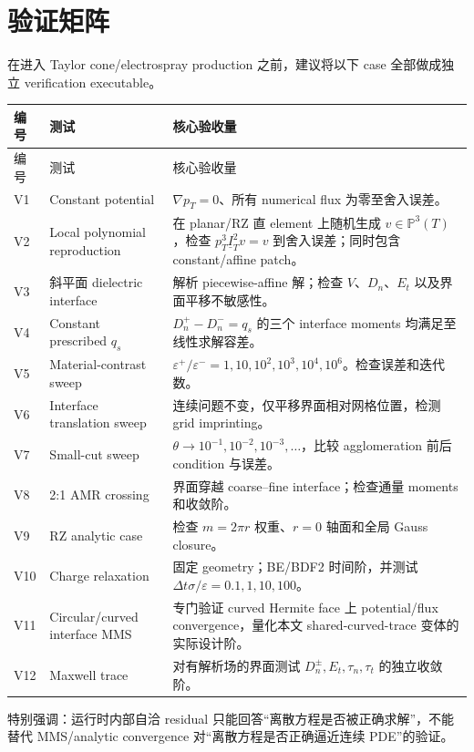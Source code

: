 \documentclass[UTF8,a4paper,11pt]{ctexart}
\newcommand{\Pp}{\mathbb{P}}
\newcommand{\eps}{\varepsilon}
\begin{document}
\section{验证矩阵}

在进入 Taylor cone/electrospray production 之前，建议将以下 case 全部做成独立 verification executable。

\begin{longtable}{p{}p{}p{}}
\toprule
编号 & 测试 & 核心验收量\\
\midrule
\endfirsthead
\toprule
编号 & 测试 & 核心验收量\\
\midrule
\endhead
V1 & Constant potential & \(\nabla p_T=0\)、所有 numerical flux 为零至舍入误差。\\
V2 & Local polynomial reproduction & 在 planar/RZ 直 element 上随机生成 \(v\in\Pp^3(T)\)，检查 \(p_T^3\underline I_T^2v=v\) 到舍入误差；同时包含 constant/affine patch。\\
V3 & 斜平面 dielectric interface & 解析 piecewise-affine 解；检查 \(V\)、\(D_n\)、\(E_t\) 以及界面平移不敏感性。\\
V4 & Constant prescribed \(q_s\) & \(D_n^+-D_n^-=q_s\) 的三个 interface moments 均满足至线性求解容差。\\
V5 & Material-contrast sweep & \(\eps^+/\eps^-=1,10,10^2,10^3,10^4,10^6\)。检查误差和迭代数。\\
V6 & Interface translation sweep & 连续问题不变，仅平移界面相对网格位置，检测 grid imprinting。\\
V7 & Small-cut sweep & \(\theta\to10^{-1},10^{-2},10^{-3},\ldots\)，比较 agglomeration 前后 condition 与误差。\\
V8 & 2:1 AMR crossing & 界面穿越 coarse--fine interface；检查通量 moments 和收敛阶。\\
V9 & RZ analytic case & 检查 \(m=2\pi r\) 权重、\(r=0\) 轴面和全局 Gauss closure。\\
V10 & Charge relaxation & 固定 geometry；BE/BDF2 时间阶，并测试 \(\Delta t\sigma/\eps=0.1,1,10,100\)。\\
V11 & Circular/curved interface MMS & 专门验证 curved Hermite face 上 potential/flux convergence，量化本文 shared-curved-trace 变体的实际设计阶。\\
V12 & Maxwell trace & 对有解析场的界面测试 \(D_n^\pm,E_t,\tau_n,\tau_t\) 的独立收敛阶。\\
\bottomrule
\end{longtable}

特别强调：运行时内部自洽 residual 只能回答“离散方程是否被正确求解”，不能替代 MMS/analytic convergence 对“离散方程是否正确逼近连续 PDE”的验证。
\end{document}
